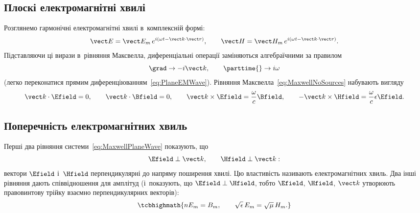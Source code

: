 \subsection*{Плоскі електромагнітні хвилі}

Розглянемо гармонічні електромагнітні хвилі в~комплексній формі:
\begin{equation}\label{eq:PlaneEMWave}
	\vect E = \vect E_m\, e^{i(\omega t-\vect k\cdot\vect r)}, \qquad \vect H = \vect H_m\, e^{i(\omega t-\vect k\cdot\vect r)}.
\end{equation}
Підставляючи ці вирази в~рівняння Максвелла, диференціальні операції заміняються алгебраїчними за правилом
\begin{equation}\label{eq:OperatorSubstitution}
	\grad \to -i\vect k, \qquad \parttime{} \to i\omega
\end{equation}
(легко переконатися прямим диференціюванням~\eqref{eq:PlaneEMWave}). Рівняння Максвелла~\eqref{eq:MaxwellNoSources} набувають вигляду
\begin{equation}\label{eq:MaxwellPlaneWave}
	\vect k\cdot\Efield=0, \qquad \vect k\cdot\Bfield=0, \qquad \vect k\times\Efield = \frac\omega{c}\Bfield, \qquad -\vect k\times\Hfield =
	\frac\omega c\epsilon\Efield.
\end{equation}

\subsection*{Поперечність електромагнітних хвиль}

Перші два рівняння системи~\eqref{eq:MaxwellPlaneWave} показують, що
\begin{equation}\label{eq:Transversality}
	\Efield \perp \vect k, \qquad \Hfield \perp \vect k:
\end{equation}
вектори $\Efield$ і~$\Hfield$ перпендикулярні до напряму поширення хвилі. Цю властивість називають  електромагнітних хвиль.
Два інші рівняння дають співвідношення для амплітуд (і~показують, що $\Efield\perp\Hfield$, тобто $\Efield$, $\Hfield$, $\vect k$ утворюють
правовинтову трійку взаємно перпендикулярних векторів):
\begin{equation}\label{eq:AmplitudeRelation}
	\tcbhighmath{
		nE_m = B_m, \qquad \sqrt\epsilon\, E_m = \sqrt\mu\, H_m.
	}
\end{equation}

